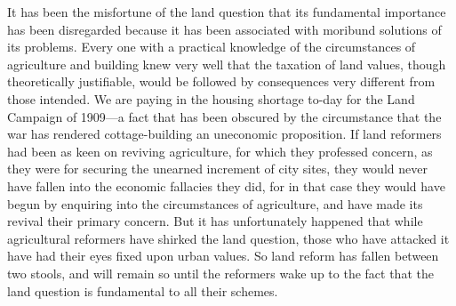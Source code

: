 \documentclass{book}
\begin{document}
It has been the misfortune of the land question that its fundamental importance has been disregarded because it has been associated with moribund solutions of its problems. Every one with a practical knowledge of the circumstances of agriculture and building knew very well that the taxation of land values, though theoretically justifiable, would be followed by consequences very different from those intended. We are paying in the housing shortage to-day for the Land Campaign of 1909—a fact that has been obscured by the circumstance that the war has rendered cottage-building an uneconomic proposition. If land reformers had been as keen on reviving agriculture, for which they professed concern, as they were for securing the unearned increment of city sites, they would never have fallen into the economic fallacies they did, for in that case they would have begun by enquiring into the circumstances of agriculture, and have made its revival their primary concern. But it has unfortunately happened that while agricultural reformers have shirked the land question, those who have attacked it have had their eyes fixed upon urban values. So land reform has fallen between two stools, and will remain so until the reformers wake up to the fact that the land question is fundamental to all their schemes.
\end{document}
